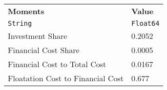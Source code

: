\begin{tabular}{ll}
  \hline\hline
  \textbf{Moments} & \textbf{Value} \\
  \texttt{String} & \texttt{Float64} \\\hline
  Investment Share & 0.2052 \\
  Financial Cost Share & 0.0005 \\
  Financial Cost to Total Cost & 0.0167 \\
  Floatation Cost to Financial Cost & 0.677 \\\hline\hline
\end{tabular}

